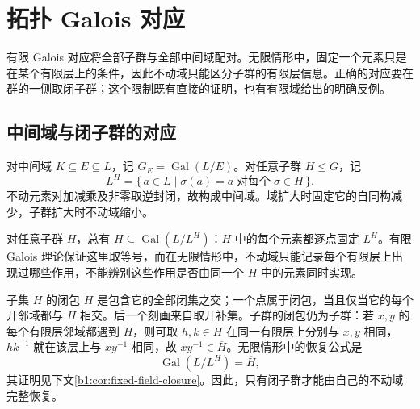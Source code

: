 
\section{拓扑 Galois 对应}
\label{b1:sec:2203}

有限 Galois 对应将全部子群与全部中间域配对。无限情形中，固定一个元素只是在某个有限层上的条件，因此不动域只能区分子群的有限层信息。正确的对应要在群的一侧取闭子群；这个限制既有直接的证明，也有有限域给出的明确反例。

%
%

\subsection{中间域与闭子群的对应}
\label{b1:subsec:2203:01}
对中间域 \(K\subseteq E\subseteq L\)，记 \(G_E=\operatorname{Gal}(L/E)\)。对任意子群 \(H\leq G\)，记
\[
	L^H=\{\,a\in L\mid\sigma(a)=a\;\text{对每个}\;\sigma\in H\,\}.
\]
不动元素对加减乘及非零取逆封闭，故构成中间域。域扩大时固定它的自同构减少，子群扩大时不动域缩小。

\ProseParagraphBreak
对任意子群 \(H\)，总有 \(H\subseteq\operatorname{Gal}(L/L^H)\)：\(H\) 中的每个元素都逐点固定 \(L^H\)。有限 Galois 理论保证这里取等号，而在无限情形中，不动域只能记录每个有限层上出现过哪些作用，不能辨别这些作用是否由同一个 \(H\) 中的元素同时实现。

\ProseParagraphBreak
子集 \(H\) 的闭包 \(\overline H\) 是包含它的全部闭集之交；一个点属于闭包，当且仅当它的每个开邻域都与 \(H\) 相交。后一个刻画来自取开补集。子群的闭包仍为子群：若 \(x,y\) 的每个有限层邻域都遇到 \(H\)，则可取 \(h,k\in H\) 在同一有限层上分别与 \(x,y\) 相同，\(hk^{-1}\) 就在该层上与 \(xy^{-1}\) 相同，故 \(xy^{-1}\in\overline H\)。无限情形中的恢复公式是
\[
	\operatorname{Gal}(L/L^H)=\overline H,
\]
其证明见下文\cref{b1:cor:fixed-field-closure}。因此，只有闭子群才能由自己的不动域完整恢复。

